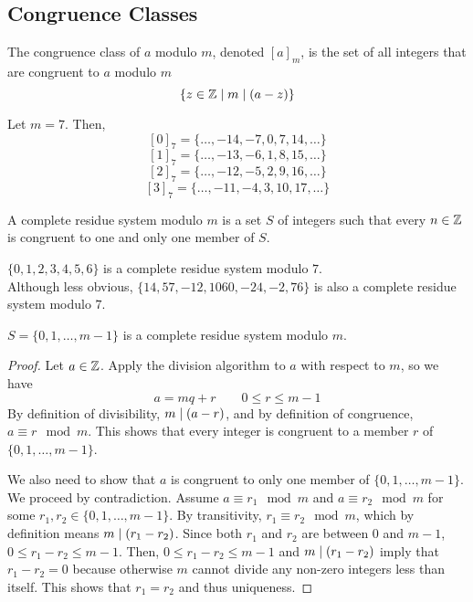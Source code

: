 \subsection{Congruence Classes}

\begin{definition}
    The congruence class of $a$ modulo $m$, denoted $[a]_m$, is the set of all integers that are congruent to $a$ modulo $m$
    $$
    \{ z \in \mathbb{Z} \mid m \mathrel{\mid} (a-z) \}
    $$
\end{definition}

\begin{example}
    Let $m = 7$. Then,
    $$
    [0]_7 = \{\ldots,-14,-7,0,7,14,\ldots\}
    $$
    $$
    [1]_7 = \{\ldots,-13,-6,1,8,15,\ldots\}
    $$
    $$
    [2]_7 = \{\ldots,-12,-5,2,9,16,\ldots\}
    $$
    $$
    [3]_7 = \{\ldots,-11,-4,3,10,17,\ldots\}
    $$
\end{example}

\begin{definition}
    A complete residue system modulo $m$ is a set $S$ of integers such that every $n \in \mathbb{Z}$ is congruent to one and only one member of $S$.
\end{definition}

\begin{example}
    $\{0,1,2,3,4,5,6\}$ is a complete residue system modulo $7$. \\ Although less obvious, $\{14,57,-12,1060,-24,-2,76\}$ is also a complete residue system modulo $7$.
\end{example}

\begin{proposition}
    $S = \{0,1,\ldots,m-1\}$ is a complete residue system modulo $m$.
\end{proposition}

\begin{proof}
    Let $a \in \mathbb{Z}$. Apply the division algorithm to $a$ with respect to $m$, so we have
    $$
    a = mq + r \qquad 0 \leq r \leq m-1
    $$
    By definition of divisibility, $m \mathrel{\mid} (a-r)$, and by definition of congruence, $a \equiv r \mod m$. This shows that every integer is congruent to a member $r$ of $\{0,1,\ldots,m-1\}$.

    We also need to show that $a$ is congruent to only one member of $\{0,1,\ldots,m-1\}$. We proceed by contradiction. Assume $a \equiv r_1 \mod m$ and $a \equiv r_2 \mod m$ for some $r_1,r_2 \in \{0,1,\ldots,m-1\}$. By transitivity, $r_1 \equiv r_2 \mod m$, which by definition means $m \mathrel{\mid} (r_1 - r_2)$. Since both $r_1$ and $r_2$ are between 0 and $m-1$, $0 \leq r_1-r_2 \leq m-1$. Then, $0 \leq r_1 - r_2 \leq m - 1$ and $m \mathrel{\mid} (r_1-r_2)$ imply that $r_1-r_2 = 0$ because otherwise $m$ cannot divide any non-zero integers less than itself. This shows that $r_1 = r_2$ and thus uniqueness.
\end{proof}

